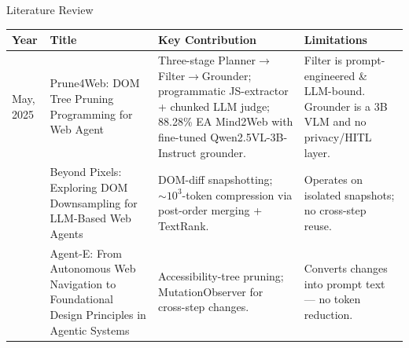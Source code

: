 \begin{frame}{Literature Review}
  \lrtable
  \begin{tabularx}{\textwidth}{p{0.7cm} p{2.8cm} X X}
    \toprule
    \textbf{Year} & \textbf{Title} & \textbf{Key Contribution} & \textbf{Limitations} \\
    \midrule
    May, 2025 \cite{zhang2025prune4web}
    & Prune4Web: DOM Tree Pruning Programming for Web Agent
    & Three-stage Planner$\to$Filter$\to$Grounder; programmatic JS-extractor + chunked LLM judge; 88.28\% EA Mind2Web with fine-tuned Qwen2.5VL-3B-Instruct grounder.
    & Filter is prompt-engineered \& LLM-bound. Grounder is a 3B VLM and no privacy/HITL layer. \\
    \addlinespace
    2025 \cite{schiepanski2025d2snap}
    & Beyond Pixels: Exploring DOM Downsampling for LLM-Based Web Agents
    & DOM-diff snapshotting; $\sim10^3$-token compression via post-order merging + TextRank.
    & Operates on isolated snapshots; no cross-step reuse. \\
    \addlinespace
    2024 \cite{tarsariya2024agente}
    & Agent-E: From Autonomous Web Navigation to Foundational Design Principles in Agentic Systems
    & Accessibility-tree pruning; MutationObserver for cross-step changes.
    & Converts changes into prompt text --- no token reduction. \\
    \bottomrule
  \end{tabularx}
\end{frame}

